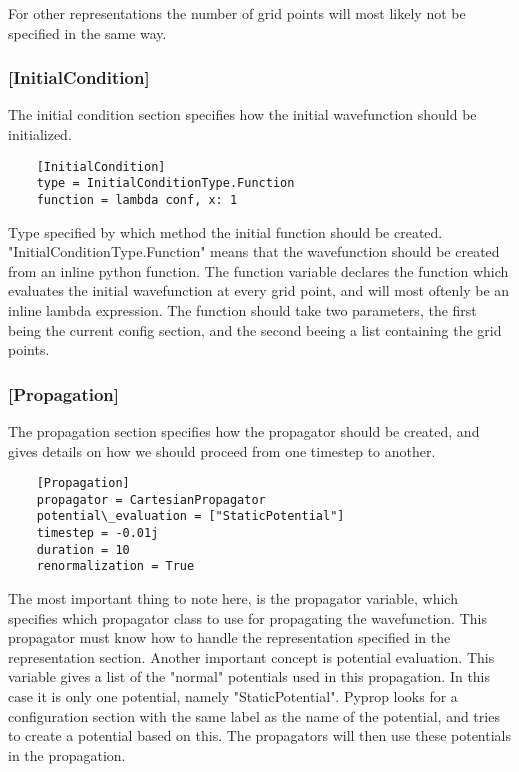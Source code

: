 For other representations the number of grid points will most likely not be specified in the same way.

\subsubsection*{[InitialCondition]}
The initial condition section specifies how the initial wavefunction should be initialized.
\begin{verbatim}
	[InitialCondition]
	type = InitialConditionType.Function
	function = lambda conf, x: 1
\end{verbatim}
Type specified by which method the initial function should be created. "InitialConditionType.Function" means that the
wavefunction should be created from an inline python function. The function variable declares the function which evaluates
the initial wavefunction at every grid point, and will most oftenly be an inline lambda expression. The function should take
two parameters, the first being the current config section, and the second beeing a list containing the grid points.

\subsubsection*{[Propagation]}
The propagation section specifies how the propagator should be created, and gives details on how we should
proceed from one timestep to another.
\begin{verbatim}
	[Propagation]
	propagator = CartesianPropagator
	potential\_evaluation = ["StaticPotential"]
	timestep = -0.01j
	duration = 10
	renormalization = True
\end{verbatim}
The most important thing to note here, is the propagator variable, which specifies which propagator class to use
for propagating the wavefunction. This propagator must know how to handle the representation specified in the
representation section. Another important concept is potential evaluation. This variable gives a list of the
"normal" potentials used in this propagation. In this case it is only one potential, namely "StaticPotential". 
Pyprop looks for a configuration section with the same label as the name of the potential, and tries to create
a potential based on this. The propagators will then use these potentials in the propagation.

